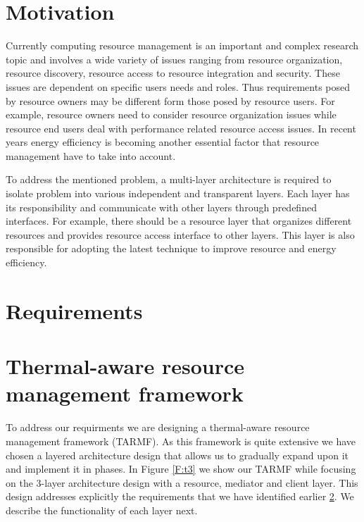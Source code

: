 \section{Motivation}

Currently computing resource management is an important and complex research topic and involves a wide variety of issues ranging from resource organization, resource discovery, resource access to resource integration and security. These issues are dependent on specific users needs and roles. Thus requirements posed by resource owners may be different form those posed by resource users. For example, resource owners need to consider resource organization issues while resource end users deal with performance related resource access issues. In recent years energy efficiency is becoming another essential factor that resource management have to take into account. 

To address the mentioned problem, a multi-layer architecture is required to isolate problem into various independent and transparent layers. Each layer has its responsibility and communicate with other layers through predefined interfaces. For example, there should be a resource layer that organizes different resources and provides resource access interface to other layers. This layer is also responsible for adopting the latest technique to improve resource and energy efficiency.

\section{Requirements}\label{S:req}


\section{Thermal-aware resource management framework}

To address our requirments we are designing a thermal-aware resource management framework (TARMF). As this framework is quite extensive we have chosen a layered architecture design that allows us to gradually expand upon it and implement it in phases.
In Figure \ref{F:t3} we show our TARMF while focusing on the  3-layer architecture design with a resource, mediator and client layer.  This design addresses explicitly the requirements that we have identified earlier \ref{S:req}. We describe the functionality of each layer next.

